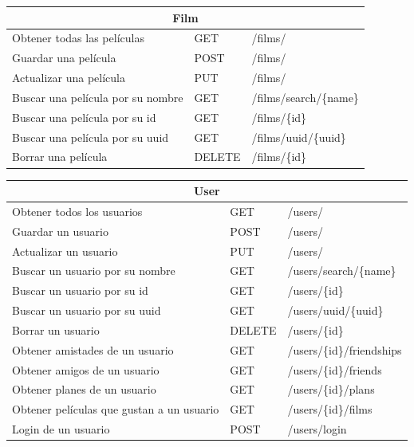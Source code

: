 \begin{center}
    \begin{tabularx}{1\textwidth}{@{\extracolsep{\fill}} | l | l | X |} \hline
    \multicolumn{3}{|c|}{Film} \\ \hline
    Obtener todas las películas & GET & /films/ \\ \hline
    Guardar una película & POST & /films/ \\ \hline
    Actualizar una película & PUT & /films/ \\ \hline
    Buscar una película por su nombre & GET & /films/search/\{name\} \\ \hline
    Buscar una película por su id & GET & /films/\{id\} \\ \hline
    Buscar una película por su uuid & GET & /films/uuid/\{uuid\} \\ \hline
    Borrar una película & DELETE & /films/\{id\} \\ \hline
    \end{tabularx}
\end{center}

\begin{center}
    \begin{tabularx}{1\textwidth}{@{\extracolsep{\fill}} | l | l | X |} \hline
    \multicolumn{3}{|c|}{User} \\ \hline
    Obtener todos los usuarios & GET & /users/ \\ \hline
    Guardar un usuario & POST & /users/ \\ \hline
    Actualizar un usuario & PUT & /users/ \\ \hline
    Buscar un usuario por su nombre & GET & /users/search/\{name\} \\ \hline
    Buscar un usuario por su id & GET & /users/\{id\} \\ \hline
    Buscar un usuario por su uuid & GET & /users/uuid/\{uuid\} \\ \hline
    Borrar un usuario & DELETE & /users/\{id\} \\ \hline
    Obtener amistades de un usuario & GET & /users/\{id\}/friendships \\ \hline
    Obtener amigos de un usuario & GET & /users/\{id\}/friends \\ \hline
    Obtener planes de un usuario & GET & /users/\{id\}/plans \\ \hline
    Obtener películas que gustan a un usuario & GET & /users/\{id\}/films \\ \hline
    Login de un usuario & POST & /users/login \\ \hline
    \end{tabularx}
\end{center}

